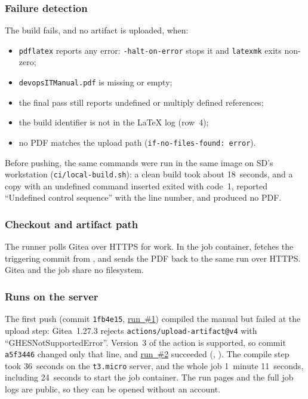 \subsubsection{Failure detection}
The build fails, and no artifact is uploaded, when:
\begin{itemize}[nosep]
  \item \texttt{pdflatex} reports any error: \texttt{-halt-on-error} stops it and \texttt{latexmk} exits non-zero;
  \item \texttt{devopsITManual.pdf} is missing or empty;
  \item the final pass still reports undefined or multiply defined references;
  \item the build identifier is not in the LaTeX log (row~4);
  \item no PDF matches the upload path (\texttt{if-no-files-found: error}).
\end{itemize}
Before pushing, the same commands were run in the same image on SD's
workstation (\texttt{ci/local-build.sh}): a clean build took about 18~seconds,
and a copy with an undefined command inserted exited with code~1, reported
``Undefined control sequence'' with the line number, and produced no PDF.

\subsubsection{Checkout and artifact path}
The runner polls Gitea over HTTPS for work. In the job container,
 fetches the triggering commit from
, and  sends
the PDF back to the same run over HTTPS. Gitea and the job share no
filesystem.

\subsubsection{Runs on the server}
The first push (commit \texttt{1fb4e15},
\href{https://git.ssw590-g1.tech/group1-startup/manual/actions/runs/1}{run~\#1})
compiled the manual but failed at the upload step: Gitea~1.27.3 rejects
\texttt{actions/upload-artifact@v4} with ``GHESNotSupportedError''. Version~3 of
the action is supported, so commit \texttt{a5f3446} changed only that line, and
\href{https://git.ssw590-g1.tech/group1-startup/manual/actions/runs/2}{run~\#2}
succeeded (, ). The compile step took 36~seconds on the
\texttt{t3.micro} server, and the whole job 1~minute 11~seconds, including
24~seconds to start the job container. The run pages and the full job logs are
public, so they can be opened without an account.

